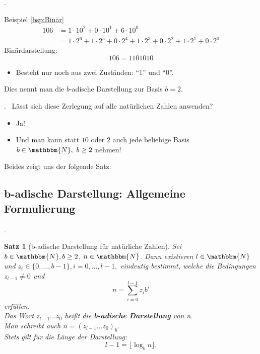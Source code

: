 \documentclass{beamer}
\newcommand{\N}{\mathbbm{N}} %
\newtheorem{satz}{Satz}[section]
\newcommand{\subsecframe}{\begin{frame}{\insertsectionnumber.\insertsubsectionnumber \ \insertsubsection}}
\begin{document}
        \subsecframe
            \begin{block}{Beispiel \ref{bsp:Binär}}
                \begin{align*}
                    106 &= 1 \cdot 10^2 + 0 \cdot 10^1 + 6 \cdot 10^0 \\
                    &= 1 \cdot 2^6 + 1 \cdot 2^5 + 0 \cdot 2^4 + 1 \cdot 2^3 + 0 \cdot 2^2 + 1 \cdot 2^1 + 0 \cdot 2^0 
                \end{align*}
                Binärdarstellung:
                \[106 = 1101010\]
                \begin{itemize}
                    \item Besteht nur noch aus zwei Zuständen: ``1'' und ``0''.
                \end{itemize}
            \end{block}
            Dies nennt man die $b$-adische Darstellung zur Basis $b=2$.
        \end{frame}

        \subsecframe
            Lässt sich diese Zerlegung auf alle natürlichen Zahlen anwenden?
            \begin{itemize}
                \item Ja! 
                \item Und man kann statt $10$ oder $2$ auch jede beliebige Basis $b \in \N,~b\geq 2$ nehmen! 
            \end{itemize}
            Beides zeigt uns der folgende Satz:
        \end{frame}

    \subsection{b-adische Darstellung: Allgemeine Formulierung}

        \subsecframe
            \begin{satz}[b-adische Darstellung für natürliche Zahlen] \label{satz:b-adische_Darstellung}
                Sei $b\in \N, b \geq 2$, $n \in \N$.
                Dann existieren $l \in \N$ und $z_i \in \{0, \dots, b-1\}, {i = 0, \dots, l-1},$ eindeutig bestimmt, welche die Bedingungen $z_{l-1} \neq 0$ und 
                \begin{equation}
                    n = \sum_{i=0}^{l-1}z_ib^i \label{eq:b-adische_Darstellung_n}
                \end{equation}
                erfüllen. \\
                Das Wort $z_{l-1}\dots z_0$ heißt die \textbf{b-adische Darstellung} von n.\\
                Man schreibt auch $n=(z_{l-1} \dots z_0)_b$. \\
                Stets gilt für die Länge der Darstellung:
                    \begin{equation}
                        l-1 = \lfloor \log_b n \rfloor. \label{eq:b-adische_Darstellung_log}
                    \end{equation}
            \end{satz}
        \end{frame}
\end{document}
